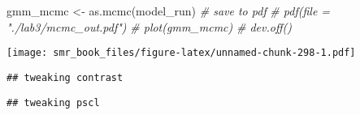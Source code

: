 \documentclass[
  oneside]{book}
\newenvironment{Shaded}{\begin{snugshade}}{\end{snugshade}}
\newcommand{\AttributeTok}[1]{\textcolor[rgb]{0.77,0.63,0.00}{#1}}
\newcommand{\CommentTok}[1]{\textcolor[rgb]{0.56,0.35,0.01}{\textit{#1}}}
\newcommand{\FunctionTok}[1]{\textcolor[rgb]{0.00,0.00,0.00}{#1}}
\newcommand{\NormalTok}[1]{#1}
\newcommand{\OtherTok}[1]{\textcolor[rgb]{0.56,0.35,0.01}{#1}}
\newcommand{\SpecialCharTok}[1]{\textcolor[rgb]{0.00,0.00,0.00}{#1}}
\newcommand{\StringTok}[1]{\textcolor[rgb]{0.31,0.60,0.02}{#1}}
\begin{document}
\begin{Shaded}
\begin{Highlighting}[]
\NormalTok{gmm\_mcmc }\OtherTok{\textless{}{-}} \FunctionTok{as.mcmc}\NormalTok{(model\_run)}
\CommentTok{\# save to pdf}
\CommentTok{\# pdf(file = "./lab3/mcmc\_out.pdf")}
\CommentTok{\# plot(gmm\_mcmc)}
\CommentTok{\# dev.off()}
\end{Highlighting}
\end{Shaded}

\begin{Shaded}
\end{Shaded}

\texttt{[image: smr\_book\_files/figure-latex/unnamed-chunk-298-1.pdf]}

\begin{verbatim}
## tweaking contrast
\end{verbatim}

\begin{verbatim}
## tweaking pscl
\end{verbatim}

  
\end{document}
